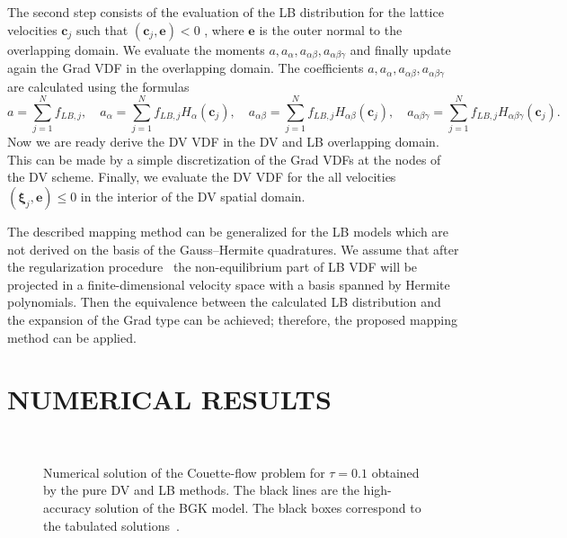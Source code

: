 \documentclass{aip-cp}
\makeatletter
\newenvironment{subfigures}
 {\begin{minipage}{\columnwidth}\def\@captype{figure}\centering}
 {\end{minipage}}
\newcommand{\bxi}{\boldsymbol{\xi}}
\newcommand{\bc}{\boldsymbol{c}}
\makeatother
\begin{document}
The second step consists of the evaluation of the LB   distribution for the lattice velocities $\boldsymbol{c}_j$ such that $(\boldsymbol{c}_j,\mathbf{e})<0$ , where $\mathbf{e}$ is the outer normal to the overlapping domain.  We evaluate the moments $a,a_{\alpha},a_{\alpha\beta},
a_{\alpha\beta\gamma}$ and finally update again the Grad VDF in the overlapping domain. The coefficients $a,a_{\alpha},a_{\alpha\beta},
a_{\alpha\beta\gamma}$ are calculated using the formulas
$$
a=\sum_{j=1}^N f_{LB,j}, \quad a_{\alpha}=\sum_{j=1}^N f_{LB,j}H_{\alpha}(\bc_j), \quad a_{\alpha\beta}=\sum_{j=1}^N f_{LB,j}H_{\alpha\beta}(\bc_j),
\quad a_{\alpha\beta\gamma}=\sum_{j=1}^N f_{LB,j}H_{\alpha\beta\gamma}(\bc_j).
$$
Now we are ready derive the DV VDF in the DV and LB overlapping domain. This can be made by a simple
discretization of the Grad VDFs at the nodes of the DV scheme. Finally, we evaluate the DV VDF for the all velocities $(\bxi_j,\mathbf{e}) \leq 0$
in the interior of the DV spatial domain.

The described mapping method can be generalized for the LB models which are not derived on the basis of the Gauss--Hermite quadratures.
We assume that after the regularization procedure~\cite{Latt2006, Chen2006}
the non-equilibrium part of LB VDF will be projected in a finite-dimensional velocity space with a basis spanned by Hermite polynomials.
Then the equivalence between the calculated LB distribution and
the expansion of the Grad type can be achieved; therefore, the proposed mapping method can be applied.

\section{NUMERICAL RESULTS}\label{sec:results}

\begin{figure}
    \begin{subfigures}
    \centering
    \subfloat[][LB method: D3Q19]{%
        \texttt{[image: d3q19]}}\\
    \subfloat[][LB method: D3Q121]{%
        \texttt{[image: d3q121]}}%
    \subfloat[][LB method: D3Q96]{%
        \texttt{[image: d3v96]}}
    \end{subfigures}
    \caption{
        Numerical solution of the Couette-flow problem for $\tau=0.1$ obtained by the pure DV and LB methods.
        The black lines are the high-accuracy solution of the BGK model.
        The black boxes correspond to the tabulated solutions~\cite{Luo2015, Luo2016}.
    }\label{fig:pure}
\end{figure}
\end{document}
